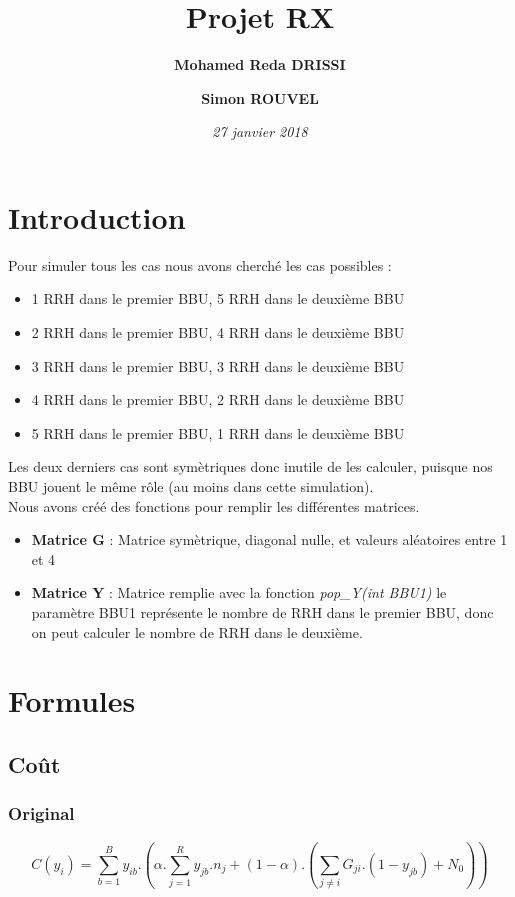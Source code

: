 \documentclass[a4paper,sans,titlepage,10pt]{article}
\title{Projet RX}
\author { \textbf{Mohamed Reda DRISSI }
			\and
		   \textbf{Simon ROUVEL}}
\date{\textit{27 janvier 2018}}
\begin{document}
\maketitle

\tableofcontents
\clearpage
\section{Introduction}
Pour simuler tous les cas nous avons cherché les cas possibles :
\begin{itemize}
	\item 1 RRH dans le premier BBU, 5 RRH dans le deuxième BBU
	\item 2 RRH dans le premier BBU, 4 RRH dans le deuxième BBU
	\item 3 RRH dans le premier BBU, 3 RRH dans le deuxième BBU
	\item 4 RRH dans le premier BBU, 2 RRH dans le deuxième BBU
	\item 5 RRH dans le premier BBU, 1 RRH dans le deuxième BBU
\end{itemize}
Les deux derniers cas sont symètriques donc inutile de les calculer, puisque nos BBU jouent
le même rôle (au moins dans cette simulation).\\
Nous avons créé des fonctions pour remplir les différentes matrices.
\begin{itemize}
	\item \textbf{Matrice G} : Matrice symètrique, diagonal nulle, et valeurs aléatoires entre 1 et 4
	\item \textbf{Matrice Y} : Matrice remplie avec la fonction \textit{pop\_Y(int BBU1)}
		le paramètre BBU1 représente le nombre de RRH dans le premier BBU, donc on peut
		calculer le nombre de RRH dans le deuxième.

\end{itemize}
\section{Formules}
\subsection{Coût}
\subsubsection{Original}
\begin{displaymath}
C(y_i)= \sum_{b=1}^By_{ib}.\left(\alpha.\sum_{j=1}^Ry_{jb}.n_j+(1-\alpha).(\sum_{j\neq i}G_{ji}.(1-y_{jb})+N_0)\right)
\end{displaymath}
\end{document}
